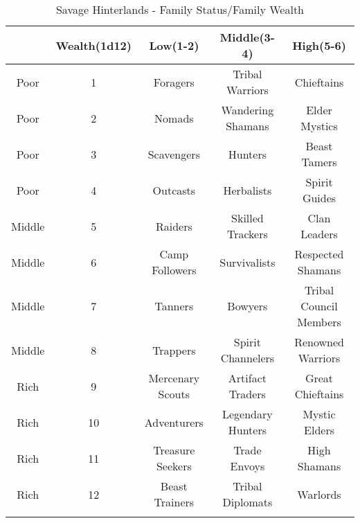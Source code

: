 \documentclass[itdr/core]{subfiles}
\begin{document}
\begin{longtable}{ccccc}
\hline
& \textbf{Wealth(1d12)} & \textbf{Low(1-2)} & \textbf{Middle(3-4)} & \textbf{High(5-6)} \\
\hline
Poor & 1 & Foragers & Tribal Warriors & Chieftains \\
Poor & 2 & Nomads & Wandering Shamans & Elder Mystics \\
Poor & 3 & Scavengers & Hunters & Beast Tamers \\
Poor & 4 & Outcasts & Herbalists & Spirit Guides \\
Middle & 5 & Raiders & Skilled Trackers & Clan Leaders \\
Middle & 6 & Camp Followers & Survivalists & Respected Shamans \\
Middle & 7 & Tanners & Bowyers & Tribal Council Members \\
Middle & 8 & Trappers & Spirit Channelers & Renowned Warriors \\
Rich & 9 & Mercenary Scouts & Artifact Traders & Great Chieftains \\
Rich & 10 & Adventurers & Legendary Hunters & Mystic Elders \\
Rich & 11 & Treasure Seekers & Trade Envoys & High Shamans \\
Rich & 12 & Beast Trainers & Tribal Diplomats & Warlords \\
\hline
\caption{Savage Hinterlands - Family Status/Family Wealth}
\label{table:savage-hinterlands}
\end{longtable}
\end{document}

